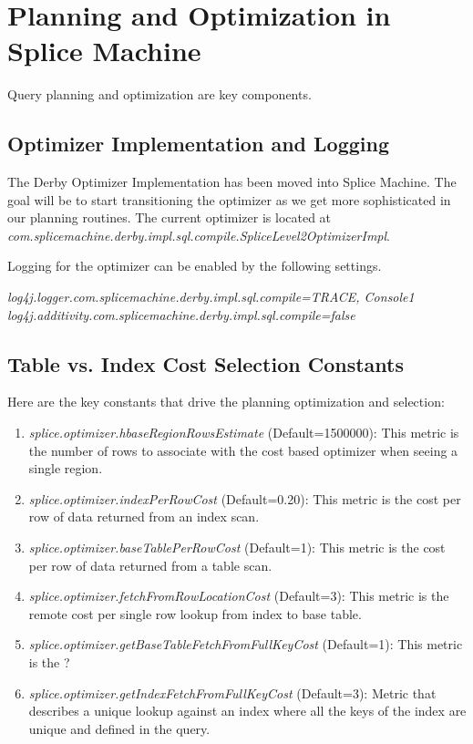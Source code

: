 \section{Planning and Optimization in Splice Machine}
Query planning and optimization are key components.

\subsection{Optimizer Implementation and Logging}

The Derby Optimizer Implementation has been moved into Splice Machine.  The goal
will be to start transitioning the optimizer as we get more sophisticated in our
planning routines.  The current optimizer is located at 
\emph{com.splicemachine.derby.impl.sql.compile.SpliceLevel2OptimizerImpl}.

Logging for the optimizer can be enabled by the following settings.

\emph{log4j.logger.com.splicemachine.derby.impl.sql.compile=TRACE, Console1}
\emph{log4j.additivity.com.splicemachine.derby.impl.sql.compile=false}

\subsection{Table vs. Index Cost Selection Constants}

Here are the key constants that drive the planning optimization and selection:

\begin{enumerate}
	\item \emph{splice.optimizer.hbaseRegionRowsEstimate} (Default=1500000): This
	metric is the number of rows to associate with the cost based optimizer when seeing a single
	region.  
	\item \emph{splice.optimizer.indexPerRowCost} (Default=0.20): This
	metric is the cost per row of data returned from an index scan. 
	\item \emph{splice.optimizer.baseTablePerRowCost} (Default=1): This
	metric is the cost per row of data returned from a table scan. 
	\item \emph{splice.optimizer.fetchFromRowLocationCost} (Default=3): This
	metric is the remote cost per single row lookup from index to base table.
	\item \emph{splice.optimizer.getBaseTableFetchFromFullKeyCost} (Default=1):
	This metric is the ?
	\item \emph{splice.optimizer.getIndexFetchFromFullKeyCost} (Default=3): Metric
	that describes a unique lookup against an index where all the keys of the
	index are unique and defined in the query.
\end{enumerate}

